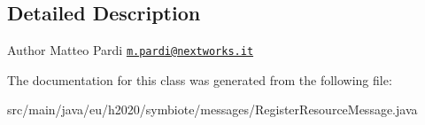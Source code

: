\subsection{Detailed Description}
\begin{DoxyAuthor}{Author}
Matteo Pardi \href{mailto:m.pardi@nextworks.it}{\tt m.\+pardi@nextworks.\+it} 
\end{DoxyAuthor}


The documentation for this class was generated from the following file\+:\begin{DoxyCompactItemize}
\item 
src/main/java/eu/h2020/symbiote/messages/Register\+Resource\+Message.\+java\end{DoxyCompactItemize}
